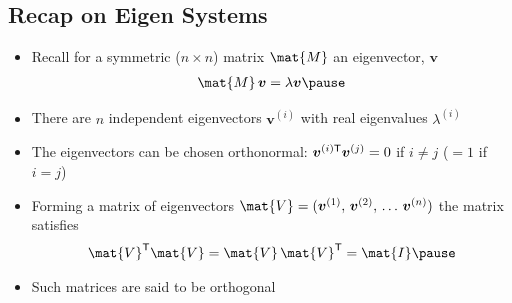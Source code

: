 \begin{slide}
\section[-1]{Recap on Eigen Systems}

\begin{PauseHighLight}
  \begin{itemize}\squeeze
  \item Recall for a symmetric ($n\times n$) matrix $\mat{M}$ an
    eigenvector, $\bm{v}$
    \begin{align*}
      \mat{M} \, \bm{v} = \lambda \bm{v}\pause
    \end{align*}
  \item There are $n$ independent eigenvectors $\bm{v}^{(i)}$ with
    real eigenvalues $\lambda^{(i)}$\pause
  \item The eigenvectors can be chosen orthonormal:
    $\bm{v}^{(i)\textsf{T}}\bm{v}^{(j)}=0$ if $i\neq j$ ($=1$ if $i=j$)\pause
  \item Forming a matrix of eigenvectors
    $\mat{V}=(\bm{v}^{(1)},\,\bm{v}^{(2)},\, \ldots\,\bm{v}^{(n)})$ the matrix
    satisfies
    \begin{align*}
      \mat{V}^\tr \mat{V} = \mat{V}\,\mat{V}^\tr = \mat{I}\pause
    \end{align*}
  \item Such matrices are said to be orthogonal\pause
      \end{itemize}
\end{PauseHighLight}

\end{slide}

